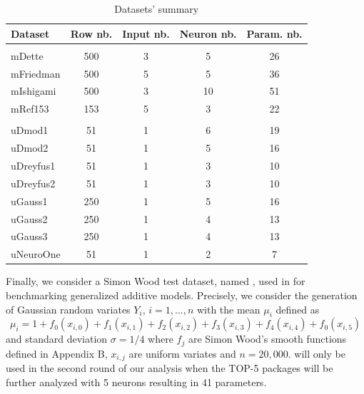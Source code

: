 \begin{Schunk}
\begin{table}

\caption{\label{tab:NNdatasets}Datasets' summary}
\centering
\fontsize{7}{9}\selectfont
\begin{tabular}[t]{lcccc}
\toprule
Dataset & Row nb. & Input nb. & Neuron nb. & Param. nb.\\
\midrule
\addlinespace[0.3em]
\multicolumn{5}{l}{\textbf{Multivariate}}\\
\hspace{1em}mDette & 500 & 3 & 5 & 26\\
\hspace{1em}mFriedman & 500 & 5 & 5 & 36\\
\hspace{1em}mIshigami & 500 & 3 & 10 & 51\\
\hspace{1em}mRef153 & 153 & 5 & 3 & 22\\
\addlinespace[0.3em]
\multicolumn{5}{l}{\textbf{Univariate}}\\
\hspace{1em}uDmod1 & 51 & 1 & 6 & 19\\
\hspace{1em}uDmod2 & 51 & 1 & 5 & 16\\
\hspace{1em}uDreyfus1 & 51 & 1 & 3 & 10\\
\hspace{1em}uDreyfus2 & 51 & 1 & 3 & 10\\
\hspace{1em}uGauss1 & 250 & 1 & 5 & 16\\
\hspace{1em}uGauss2 & 250 & 1 & 4 & 13\\
\hspace{1em}uGauss3 & 250 & 1 & 4 & 13\\
\hspace{1em}uNeuroOne & 51 & 1 & 2 & 7\\
\bottomrule
\end{tabular}
\end{table}

\end{Schunk}

Finally, we consider a Simon Wood test dataset, named ,
used in \citep{wood2011fast} for benchmarking generalized additive
models. Precisely, we consider the generation of Gaussian random
variates \(Y_i\), \(i=1,\dots,n\) with the mean \(\mu_i\) defined as \[
\mu_i = 1+ f_0(x_{i,0})+f_1(x_{i,1})+f_2(x_{i,2})+f_3(x_{i,3})
+f_4(x_{i,4})+f_0(x_{i,5})
\] and standard deviation \(\sigma=1/4\) where \(f_j\) are Simon Wood's
smooth functions defined in Appendix B, \(x_{i,j}\) are uniform variates
and \(n=20,000\).  will only be used in the second round
of our analysis when the TOP-5 packages will be further analyzed with 5
neurons resulting in 41 parameters.

